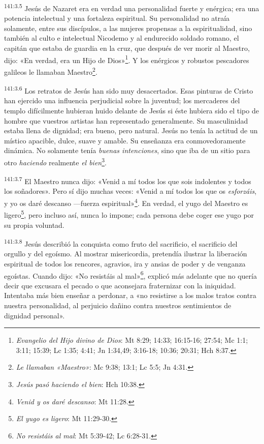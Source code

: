 \par 
\textsuperscript{141:3.5} Jesús de Nazaret era en verdad una personalidad fuerte y enérgica; era una potencia intelectual y una fortaleza espiritual. Su personalidad no atraía solamente, entre sus discípulos, a las mujeres propensas a la espiritualidad, sino también al culto e intelectual Nicodemo y al endurecido soldado romano, el capitán que estaba de guardia en la cruz, que después de ver morir al Maestro, dijo: «En verdad, era un Hijo de Dios»\footnote{\textit{Evangelio del Hijo divino de Dios}: Mt 8:29; 14:33; 16:15-16; 27:54; Mc 1:1; 3:11; 15:39; Lc 1:35; 4:41; Jn 1:34,49; 3:16-18; 10:36; 20:31; Hch 8:37.}. Y los enérgicos y robustos pescadores galileos le llamaban Maestro\footnote{\textit{Le llamaban «Maestro»}: Mc 9:38; 13:1; Lc 5:5; Jn 4:31.}.

\par 
\textsuperscript{141:3.6} Los retratos de Jesús han sido muy desacertados. Esas pinturas de Cristo han ejercido una influencia perjudicial sobre la juventud; los mercaderes del templo difícilmente hubieran huido delante de Jesús si éste hubiera sido el tipo de hombre que vuestros artistas han representado generalmente. Su masculinidad estaba llena de dignidad; era bueno, pero natural. Jesús no tenía la actitud de un místico apacible, dulce, suave y amable. Su enseñanza era conmovedoramente dinámica. No solamente tenía \textit{buenas intenciones}, sino que iba de un sitio para otro \textit{haciendo} realmente \textit{el bien}\footnote{\textit{Jesús pasó haciendo el bien}: Hch 10:38.}.

\par 
\textsuperscript{141:3.7} El Maestro nunca dijo: «Venid a mí todos los que sois indolentes y todos los soñadores». Pero sí dijo muchas veces: «Venid a mí todos los que os \textit{esforzáis}, y yo os daré descanso ---fuerza espiritual»\footnote{\textit{Venid y os daré descanso}: Mt 11:28.}. En verdad, el yugo del Maestro es ligero\footnote{\textit{El yugo es ligero}: Mt 11:29-30.}, pero incluso así, nunca lo impone; cada persona debe coger ese yugo por su propia voluntad.

\par 
\textsuperscript{141:3.8} Jesús describió la conquista como fruto del sacrificio, el sacrificio del orgullo y del egoísmo. Al mostrar misericordia, pretendía ilustrar la liberación espiritual de todos los rencores, agravios, ira y ansias de poder y de venganza egoístas. Cuando dijo: «No resistáis al mal»\footnote{\textit{No resistáis al mal}: Mt 5:39-42; Lc 6:28-31.}, explicó más adelante que no quería decir que excusara el pecado o que aconsejara fraternizar con la iniquidad. Intentaba más bien enseñar a perdonar, a «no resistirse a los malos tratos contra nuestra personalidad, al perjuicio dañino contra nuestros sentimientos de dignidad personal».

